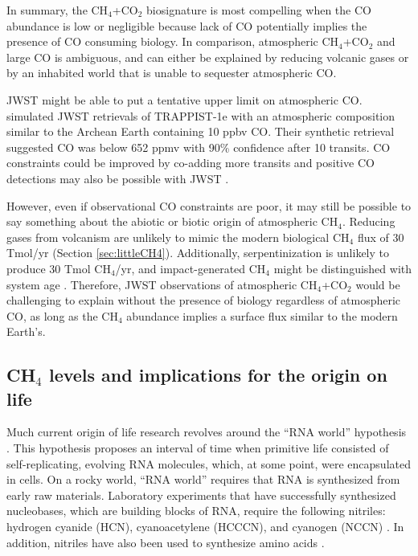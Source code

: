 In summary, the CH$_4$+CO$_2$ biosignature is most compelling when the CO abundance is low or negligible because lack of CO potentially implies the presence of CO consuming biology. In comparison, atmospheric CH$_4$+CO$_2$ and large CO is ambiguous, and can either be explained by reducing volcanic gases or by an inhabited world that is unable to sequester atmospheric CO.

JWST might be able to put a tentative upper limit on atmospheric CO. \citet{Krissansen-Totton_2018a} simulated JWST retrievals of TRAPPIST-1e with an atmospheric composition similar to the Archean Earth containing 10 ppbv CO. Their synthetic retrieval suggested CO was below 652 ppmv with 90\% confidence after 10 transits. CO constraints could be improved by co-adding more transits and positive CO detections may also be possible with JWST \citep{Wunderlich_2020}.

However, even if observational CO constraints are poor, it may still be possible to say something about the abiotic or biotic origin of atmospheric CH$_4$. Reducing gases from volcanism are unlikely to mimic the modern biological CH$_4$ flux of 30 Tmol/yr (Section \ref{sec:littleCH4}). Additionally, serpentinization is unlikely to produce 30 Tmol CH$_4$/yr, and impact-generated CH$_4$ might be distinguished with system age \citep{Krissansen-Totton_2018b}. Therefore, JWST observations of atmospheric CH$_4$+CO$_2$ would be challenging to explain without the presence of biology regardless of atmospheric CO, as long as the CH$_4$ abundance implies a surface flux similar to the modern Earth's.

\subsection{CH$_4$ levels and implications for the origin on life}

Much current origin of life research revolves around the ``RNA world'' hypothesis \citep{Gilbert_1986,Joyce_2018,Sasselov_2020}. This hypothesis proposes an interval of time when primitive life consisted of self-replicating, evolving RNA molecules, which, at some point, were encapsulated in cells. On a rocky world, ``RNA world'' requires that RNA is synthesized from early raw materials. Laboratory experiments that have successfully synthesized nucleobases, which are building blocks of RNA, require the following nitriles: hydrogen cyanide (HCN), cyanoacetylene (HCCCN), and cyanogen (NCCN) \citep{Sutherland_2016,Ritson_2018,Benner_2019}. In addition, nitriles have also been used to synthesize amino acids \citep{Miller_1959,Sutherland_2016}.

